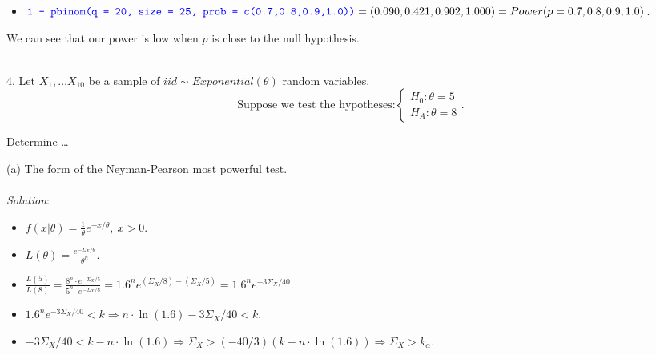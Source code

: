 \documentclass[12pt]{article}
\newcommand{\XB}{\color{black}}
\newcommand{\XBB}{\color{blue}}
\newcommand{\ds}{\displaystyle}
\begin{document}
\begin{itemize}
    \item $ \ds {\XBB \texttt{1 - pbinom(q = 20, size = 25, prob = c(0.7,0.8,0.9,1.0))}} \\ = (0.090, 0.421, 0.902, 1.000) = Power(p = 0.7, 0.8, 0.9, 1.0) $.
\end{itemize}

\noindent
We can see that our power is low when $ p $ is close to the null hypothesis. \\

\vspace{2.5mm}

\newpage
\XBB\hrulefill\XB \\

4. Let $ \ds X_{1}, \dots X_{10} $ be a sample of $ iid \sim Exponential(\theta) $ random variables, \\

\[
    \text{Suppose we test the hypotheses:}
    \left\{ 
        \begin{array}{rl}
            H_{0} : \theta = 5 \\
            H_{A} : \theta = 8
        \end{array}.
    \right.
\]

Determine \dots \\

\XBB\hrulefill\XB 
\vspace{5mm} 

(a) The form of the Neyman-Pearson most powerful test. \\
\vspace{2.5mm} \\
\textit{Solution}:
\vspace{2.5mm} \\

\begin{itemize}
    \item $ \ds f(x | \theta) = \frac{1}{\theta}e^{-x / \theta} , \ x > 0 $.
    \item $ \ds L(\theta) = \frac{e^{-\Sigma_{X} / \theta}}{\theta^{n}} $.
    \item $ \ds \frac{L(5)}{L(8)} = \frac{8^{n} \cdot e^{-\Sigma_{X} / 5}}{5^{n} \cdot e^{-\Sigma_{X} / 8}} = 1.6^{n} e^{(\Sigma_{X} / 8) - (\Sigma_{X} / 5)} = 1.6^{n} e^{-3\Sigma_{X} / 40} $.
    \item $ \ds 1.6^{n} e^{-3\Sigma_{X} / 40} < k \Rightarrow n \cdot \ln(1.6) -3\Sigma_{X} / 40 < k $.
    \item $ \ds -3\Sigma_{X} / 40 < k - n \cdot \ln(1.6) \Rightarrow \Sigma_{X} > (-40/3)(k - n \cdot \ln(1.6)) \Rightarrow \Sigma_{X} > k_{\alpha} $.
\end{itemize}
\end{document}
